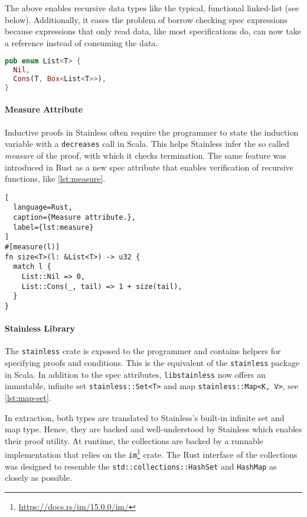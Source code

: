 The above enables recursive data types like the typical, functional linked-list
(see below). Additionally, it eases the problem of borrow checking spec
expressions because expressions that only read data, like most specifications
do, can now take a reference instead of consuming the data.

\begin{lstlisting}[language=Rust, style=short]
pub enum List<T> {
  Nil,
  Cons(T, Box<List<T>>),
}
\end{lstlisting}

\paragraph{Measure Attribute}

Inductive proofs in Stainless often require the programmer to state the
induction variable with a \lstinline!decreases! call in Scala. This helps
Stainless infer the so called \emph{measure} of the proof, with which it checks
termination. The same feature was introduced in Rust as a new spec attribute
that enables verification of recursive functions, like \autoref{lst:measure}.

\begin{lstlisting}[
  language=Rust,
  caption={Measure attribute.},
  label={lst:measure}
]
#[measure(l)]
fn size<T>(l: &List<T>) -> u32 {
  match l {
    List::Nil => 0,
    List::Cons(_, tail) => 1 + size(tail),
  }
}
\end{lstlisting}

\paragraph{Stainless Library}

The \lstinline!stainless! crate is exposed to the programmer and contains
helpers for specifying proofs and conditions. This is the equivalent of the
\lstinline!stainless! package in Scala. In addition to the spec attributes,
\lstinline!libstainless! now offers an immutable, infinite set
\passthrough{\lstinline!stainless::Set<T>!} and map
\passthrough{\lstinline!stainless::Map<K, V>!}, see \autoref{lst:map-set}.

In extraction, both types are translated to Stainless's built-in infinite set
and map type. Hence, they are backed and well-understood by Stainless which
enables their proof utility. At runtime, the collections are backed by a
runnable implementation that relies on the
\lstinline!im!\footnote{\url{https://docs.rs/im/15.0.0/im/}} crate. The Rust
interface of the collections was designed to resemble the
\lstinline!std::collections::HashSet! and \lstinline!HashMap! as closely as
possible.

